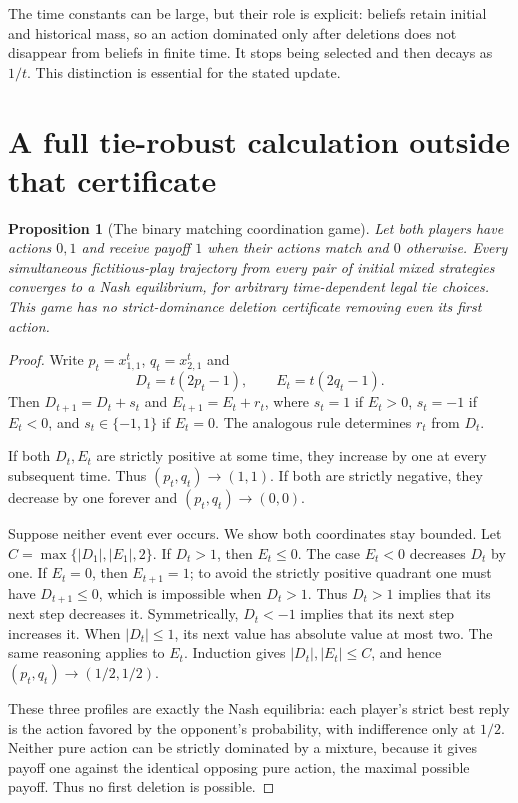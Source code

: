 \documentclass[11pt]{article}
\newtheorem{proposition}[theorem]{Proposition}
\theoremstyle{definition}
\begin{document}
The time constants can be large, but their role is explicit: beliefs retain initial and historical mass, so an action dominated only after deletions does not disappear from beliefs in finite time. It stops being selected and then decays as $1/t$. This distinction is essential for the stated update.

\section*{A full tie-robust calculation outside that certificate}
\begin{proposition}[The binary matching coordination game]
Let both players have actions $0,1$ and receive payoff $1$ when their actions match and $0$ otherwise. Every simultaneous fictitious-play trajectory from every pair of initial mixed strategies converges to a Nash equilibrium, for arbitrary time-dependent legal tie choices. This game has no strict-dominance deletion certificate removing even its first action.
\end{proposition}
\begin{proof}
Write $p_t=x_{1,1}^t$, $q_t=x_{2,1}^t$ and
\[
 D_t=t(2p_t-1),\qquad E_t=t(2q_t-1).
\]
Then $D_{t+1}=D_t+s_t$ and $E_{t+1}=E_t+r_t$, where $s_t=1$ if $E_t>0$, $s_t=-1$ if $E_t<0$, and $s_t\in\{-1,1\}$ if $E_t=0$. The analogous rule determines $r_t$ from $D_t$.

If both $D_t,E_t$ are strictly positive at some time, they increase by one at every subsequent time. Thus $(p_t,q_t)\to(1,1)$. If both are strictly negative, they decrease by one forever and $(p_t,q_t)\to(0,0)$.

Suppose neither event ever occurs. We show both coordinates stay bounded. Let $C=\max\{|D_1|,|E_1|,2\}$. If $D_t>1$, then $E_t\le0$. The case $E_t<0$ decreases $D_t$ by one. If $E_t=0$, then $E_{t+1}=1$; to avoid the strictly positive quadrant one must have $D_{t+1}\le0$, which is impossible when $D_t>1$. Thus $D_t>1$ implies that its next step decreases it. Symmetrically, $D_t<-1$ implies that its next step increases it. When $|D_t|\le1$, its next value has absolute value at most two. The same reasoning applies to $E_t$. Induction gives $|D_t|,|E_t|\le C$, and hence $(p_t,q_t)\to(1/2,1/2)$.

These three profiles are exactly the Nash equilibria: each player's strict best reply is the action favored by the opponent's probability, with indifference only at $1/2$. Neither pure action can be strictly dominated by a mixture, because it gives payoff one against the identical opposing pure action, the maximal possible payoff. Thus no first deletion is possible.
\end{proof}
\end{document}

